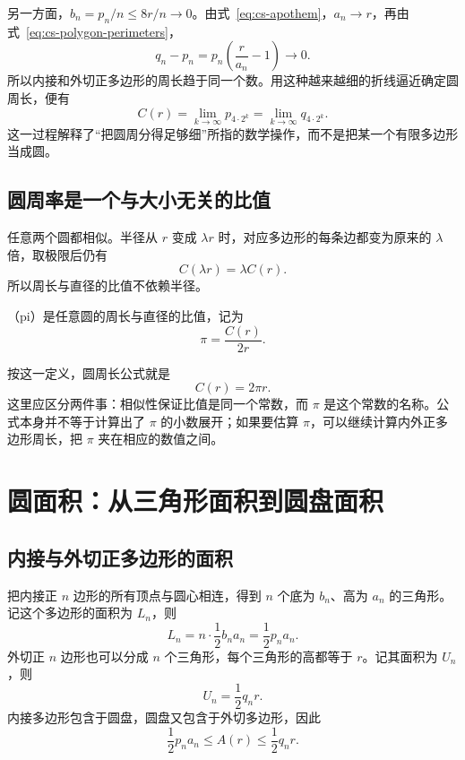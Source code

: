 \documentclass[UTF8]{ctexart}
\begin{document}
另一方面，$b_n=p_n/n\leq8r/n\to0$。由式~\eqref{eq:cs-apothem}，$a_n\to r$，再由式~\eqref{eq:cs-polygon-perimeters}，
\[
  q_n-p_n=p_n\left(\frac{r}{a_n}-1\right)\longrightarrow0.
\]
所以内接和外切正多边形的周长趋于同一个数。用这种越来越细的折线逼近确定圆周长，便有
\begin{equation}\label{eq:cs-perimeter-limit}
  C(r)=\lim_{k\to\infty}p_{4\cdot2^k}
      =\lim_{k\to\infty}q_{4\cdot2^k}.
\end{equation}
这一过程解释了“把圆周分得足够细”所指的数学操作，而不是把某一个有限多边形当成圆。

\subsection{圆周率是一个与大小无关的比值}

任意两个圆都相似。半径从 $r$ 变成 $\lambda r$ 时，对应多边形的每条边都变为原来的 $\lambda$ 倍，取极限后仍有
\[
  C(\lambda r)=\lambda C(r).
\]
所以周长与直径的比值不依赖半径。

\begin{definition}[圆周率]
（pi）是任意圆的周长与直径的比值，记为
\begin{equation}\label{eq:cs-pi-definition}
  \pi=\frac{C(r)}{2r}.
\end{equation}
\end{definition}

按这一定义，圆周长公式就是
\begin{equation}\label{eq:cs-circumference}
  \boxed{C(r)=2\pi r}.
\end{equation}
这里应区分两件事：相似性保证比值是同一个常数，而 $\pi$ 是这个常数的名称。公式本身并不等于计算出了 $\pi$ 的小数展开；如果要估算 $\pi$，可以继续计算内外正多边形周长，把 $\pi$ 夹在相应的数值之间。

\section{圆面积：从三角形面积到圆盘面积}
\label{sec:cs-circle-area}

\subsection{内接与外切正多边形的面积}

把内接正 $n$ 边形的所有顶点与圆心相连，得到 $n$ 个底为 $b_n$、高为 $a_n$ 的三角形。记这个多边形的面积为 $L_n$，则
\[
  L_n=n\cdot\frac12b_na_n=\frac12p_na_n.
\]
外切正 $n$ 边形也可以分成 $n$ 个三角形，每个三角形的高都等于 $r$。记其面积为 $U_n$，则
\[
  U_n=\frac12q_nr.
\]
内接多边形包含于圆盘，圆盘又包含于外切多边形，因此
\begin{equation}\label{eq:cs-area-squeeze}
  \frac12p_na_n\leq A(r)\leq\frac12q_nr.
\end{equation}
\end{document}
